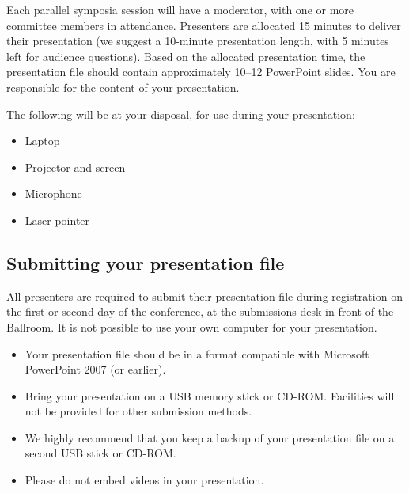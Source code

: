 \documentclass[12pt]{article}
\title{\Huge\scshape\textrmlf{Presentation guidelines}}
\author{}
\date{}
\begin{document}
\maketitle
\vspace{-5pc}
\raggedright
\thispagestyle{fancy}

Each parallel symposia session will have a moderator, with one or more committee members in attendance. Presenters are allocated 15 minutes to deliver their presentation (we suggest a 10-minute presentation length, with 5 minutes left for audience questions). Based on the allocated presentation time, the presentation file should contain approximately 10–12 PowerPoint slides. You are responsible for the content of your presentation. 

The following will be at your disposal, for use during your presentation:

\begin{itemize}[itemsep=0mm,leftmargin=3.2mm]
  \item Laptop
  \item Projector and screen
  \item Microphone
  \item Laser pointer
\end{itemize}

\subsection*{Submitting your presentation file}

All presenters are required to submit their presentation file during registration on the first or second day of the conference, at the submissions desk in front of the Ballroom. It is not possible to use your own computer for your presentation.

\begin{itemize}[itemsep=0mm,leftmargin=3.2mm]
  \item Your presentation file should be in a format compatible with Microsoft PowerPoint 2007 (or earlier).
  \item Bring your presentation on a USB memory stick or CD-ROM. Facilities will not be provided for other submission methods.
  \item We highly recommend that you keep a backup of your presentation file on a second USB stick or CD-ROM.
  \item Please do not embed videos in your presentation.
\end{itemize}
\end{document}
